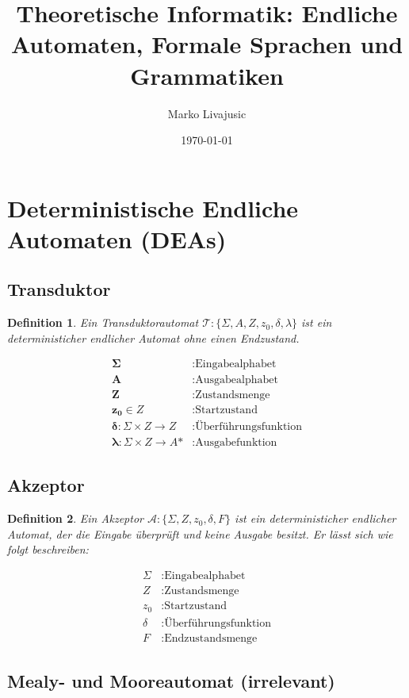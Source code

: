 \documentclass{book}
\author{Marko Livajusic}
\date{\today}
\title{Theoretische Informatik: Endliche Automaten, Formale Sprachen und Grammatiken}
\newtheorem{definition}{Definition}
\begin{document}
\maketitle
\tableofcontents

\section{Deterministische Endliche Automaten (DEAs)}
\subsection{Transduktor}
\begin{definition}
Ein Transduktorautomat $\mathcal{T}: \{\Sigma, A, Z, z_{0}, \delta, \lambda\}$ ist ein deterministicher endlicher Automat ohne einen Endzustand.
\end{definition}
\begin{align*}
    \mathbf{\Sigma} &: \text{Eingabealphabet}\\
    \mathbf{A} &: \text{Ausgabealphabet}\\
    \mathbf{Z} &: \text{Zustandsmenge}\\
    \mathbf{z_{0}} \in Z &: \text{Startzustand}\\
    \mathbf{\delta }: \Sigma \times Z \rightarrow Z &: \text{Überführungsfunktion}\\
    \mathbf{\lambda }: \Sigma \times Z \rightarrow A\text{*} &: \text{Ausgabefunktion}
\end{align*}

\subsection{Akzeptor}
\begin{definition}
Ein Akzeptor $\mathcal{A}: \{\Sigma, Z, z_{0}, \delta, F\}$ ist ein deterministicher endlicher Automat, der die Eingabe überprüft und keine Ausgabe besitzt. Er lässt sich wie folgt beschreiben:
\end{definition}
    \begin{align*}
    \Sigma &: \text{Eingabealphabet}\\
    Z &: \text{Zustandsmenge}\\
    z_{0} &: \text{Startzustand}\\
    \delta &: \text{Überführungsfunktion}\\
    F &: \text{Endzustandsmenge}
\end{align*}

\subsection{Mealy- und Mooreautomat (irrelevant)}
\end{document}
